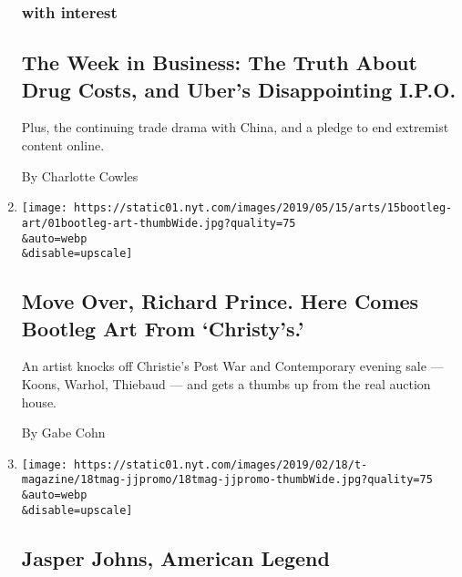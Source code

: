 \begin{enumerate}
  \hypertarget{with-interest}{%
  \subsubsection{with interest}\label{with-interest}}

  \hypertarget{the-week-in-business-the-truth-about-drug-costs-and-ubers-disappointing-ipo}{%
  \subsection{The Week in Business: The Truth About Drug Costs, and
  Uber's Disappointing
  I.P.O.}\label{the-week-in-business-the-truth-about-drug-costs-and-ubers-disappointing-ipo}}

  Plus, the continuing trade drama with China, and a pledge to end
  extremist content online.

  By Charlotte Cowles
\item
  \href{/2019/05/01/arts/design/eric-doeringer-christies-auction-andy-warhol-robert-rauschenberg.html}{}

  \texttt{[image: https://static01.nyt.com/images/2019/05/15/arts/15bootleg-art/01bootleg-art-thumbWide.jpg?quality=75\\\&auto=webp\\\&disable=upscale]}

  \hypertarget{move-over-richard-prince-here-comes-bootleg-art-from-christys}{%
  \subsection{Move Over, Richard Prince. Here Comes Bootleg Art From
  `Christy's.'}\label{move-over-richard-prince-here-comes-bootleg-art-from-christys}}

  An artist knocks off Christie's Post War and Contemporary evening sale
  --- Koons, Warhol, Thiebaud --- and gets a thumbs up from the real
  auction house.

  By Gabe Cohn
\item
  \href{/2019/02/18/t-magazine/jasper-johns.html}{}

  \texttt{[image: https://static01.nyt.com/images/2019/02/18/t-magazine/18tmag-jjpromo/18tmag-jjpromo-thumbWide.jpg?quality=75\\\&auto=webp\\\&disable=upscale]}

  \hypertarget{jasper-johns-american-legend}{%
  \subsection{Jasper Johns, American
  Legend}\label{jasper-johns-american-legend}}


\end{enumerate}
